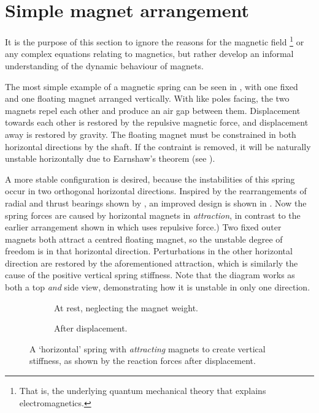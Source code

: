 \section{Simple magnet arrangement}

It is the purpose of this section to ignore the reasons for the
magnetic field%
\footnote{That is, the underlying quantum mechanical theory that
  explains electromagnetics.}  or any complex equations relating to
magnetics, but rather develop an informal understanding of the dynamic
behaviour of magnets.

The most simple example of a magnetic spring can be seen in
, with one fixed and one floating magnet arranged
vertically.  With like poles facing, the two magnets repel each other
and produce an air gap between them. Displacement towards each other
is restored by the repulsive magnetic force, and displacement away is
restored by gravity. The floating magnet must be constrained in both
horizontal directions by the shaft. If the contraint is removed, it
will be naturally unstable horizontally due to Earnshaw's theorem (see
).

A more stable configuration is desired, because the instabilities of
this spring occur in two orthogonal horizontal directions. Inspired by
the rearrangements of radial and thrust bearings shown by
\textcite{yonnet1981}, an improved design is shown in
. Now the spring forces are caused by horizontal
magnets in \emph{attraction}, in contrast to the earlier arrangement
shown in  which uses repulsive force.) Two fixed
outer magnets both attract a centred floating magnet, so the unstable
degree of freedom is in that horizontal direction. Perturbations in
the other horizontal direction are restored by the aforementioned
attraction, which is similarly the cause of the positive vertical
spring stiffness. Note that the diagram works as both a top \emph{and}
side view, demonstrating how it is unstable in only one direction.

\begin{figure}
  \begin{subfigure}
    \caption{At rest, neglecting the magnet weight.}
  \end{subfigure}
  \begin{subfigure}
    \caption{After displacement.}
  \end{subfigure}
  \caption[`Horizontal' spring.]{A `horizontal' spring with \emph{attracting}
magnets to create vertical stiffness, as shown by the reaction forces after
displacement.}
\end{figure}

